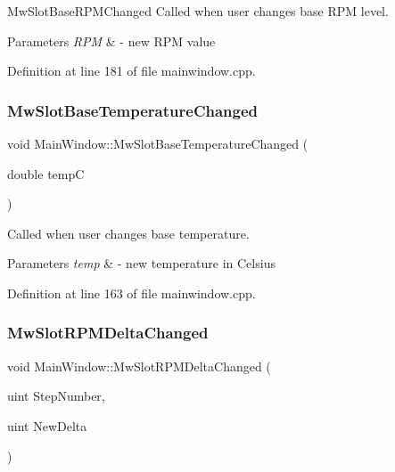 Mw\+Slot\+Base\+R\+P\+M\+Changed Called when user changes base R\+PM level. 


\begin{DoxyParams}{Parameters}
{\em R\+PM} & -\/ new R\+PM value \\
\hline
\end{DoxyParams}


Definition at line 181 of file mainwindow.\+cpp.

\mbox{\label{class_main_window_a0a690287dffb47b6477f2fb50c2a818e}} 
\subsubsection{\texorpdfstring{Mw\+Slot\+Base\+Temperature\+Changed}{MwSlotBaseTemperatureChanged}}
{\footnotesize\ttfamily void Main\+Window\+::\+Mw\+Slot\+Base\+Temperature\+Changed (\begin{DoxyParamCaption}\item[{double}]{tempC }\end{DoxyParamCaption})\hspace{0.3cm}{\ttfamily [slot]}}



Called when user changes base temperature. 


\begin{DoxyParams}{Parameters}
{\em temp} & -\/ new temperature in Celsius \\
\hline
\end{DoxyParams}


Definition at line 163 of file mainwindow.\+cpp.

\mbox{\label{class_main_window_a32b3a311b7151092db3ec0756d2c22d4}} 
\subsubsection{\texorpdfstring{Mw\+Slot\+R\+P\+M\+Delta\+Changed}{MwSlotRPMDeltaChanged}}
{\footnotesize\ttfamily void Main\+Window\+::\+Mw\+Slot\+R\+P\+M\+Delta\+Changed (\begin{DoxyParamCaption}\item[{uint}]{Step\+Number,  }\item[{uint}]{New\+Delta }\end{DoxyParamCaption})\hspace{0.3cm}{\ttfamily [slot]}}



